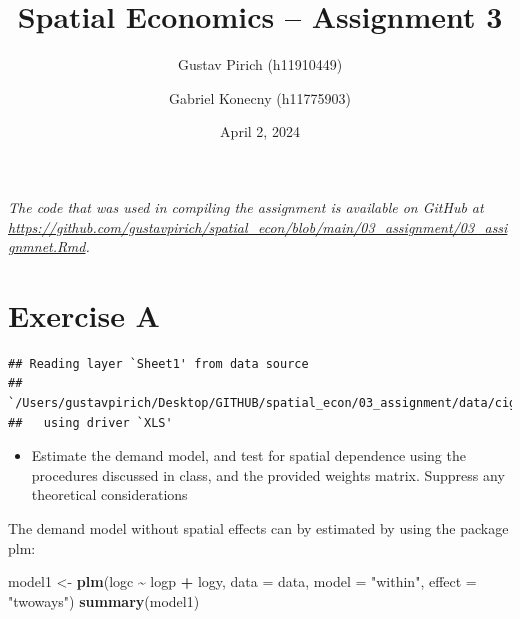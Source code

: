 \documentclass[
  a4paper,
]{article}
\title{Spatial Economics -- Assignment 3}
\author{Gustav Pirich (h11910449) \and Gabriel Konecny (h11775903)}
\date{April 2, 2024}
\newenvironment{Shaded}{\begin{snugshade}}{\end{snugshade}}
\newcommand{\AttributeTok}[1]{\textcolor[rgb]{0.13,0.29,0.53}{#1}}
\newcommand{\FunctionTok}[1]{\textcolor[rgb]{0.13,0.29,0.53}{\textbf{#1}}}
\newcommand{\NormalTok}[1]{#1}
\newcommand{\OtherTok}[1]{\textcolor[rgb]{0.56,0.35,0.01}{#1}}
\newcommand{\SpecialCharTok}[1]{\textcolor[rgb]{0.81,0.36,0.00}{\textbf{#1}}}
\newcommand{\StringTok}[1]{\textcolor[rgb]{0.31,0.60,0.02}{#1}}
\providecommand{\tightlist}{%
  \setlength{\itemsep}{0pt}\setlength{\parskip}{0pt}}
\begin{document}
\maketitle

{
\hypersetup{linkcolor=}
\setcounter{tocdepth}{2}
\tableofcontents
}
\vspace{2em}

\begin{tcolorbox}
\centering \itshape The code that was used in compiling the assignment is available on GitHub at \url{https://github.com/gustavpirich/spatial_econ/blob/main/03_assignment/03_assignmnet.Rmd}.
\end{tcolorbox}

\newpage

\hypertarget{exercise-a}{%
\section{Exercise A}\label{exercise-a}}

\begin{verbatim}
## Reading layer `Sheet1' from data source 
##   `/Users/gustavpirich/Desktop/GITHUB/spatial_econ/03_assignment/data/cigarettes/cigar_states.xls' 
##   using driver `XLS'
\end{verbatim}

\begin{itemize}
\tightlist
\item
  Estimate the demand model, and test for spatial dependence using the
  procedures discussed in class, and the provided weights matrix.
  Suppress any theoretical considerations
\end{itemize}

The demand model without spatial effects can by estimated by using the
package plm:

\begin{Shaded}
\begin{Highlighting}[]
\NormalTok{model1 }\OtherTok{\textless{}{-}} \FunctionTok{plm}\NormalTok{(logc }\SpecialCharTok{\textasciitilde{}}\NormalTok{ logp }\SpecialCharTok{+}\NormalTok{ logy, }\AttributeTok{data =}\NormalTok{ data, }\AttributeTok{model =} \StringTok{"within"}\NormalTok{, }\AttributeTok{effect =} \StringTok{"twoways"}\NormalTok{)}
\FunctionTok{summary}\NormalTok{(model1)}
\end{Highlighting}
\end{Shaded}
\end{document}
